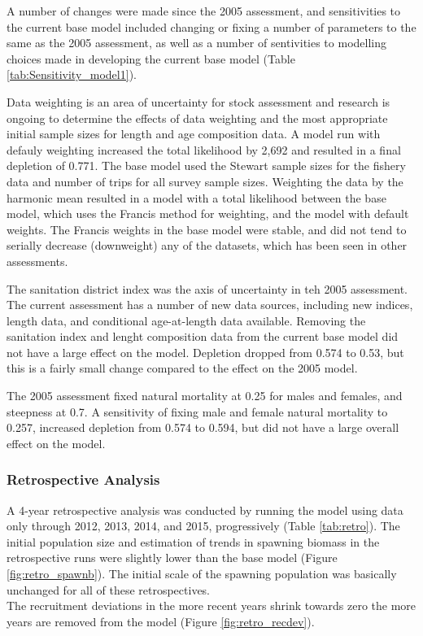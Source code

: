 \documentclass[12pt,]{article}
\begin{document}
A number of changes were made since the 2005 assessment, and
sensitivities to the current base model included changing or fixing a
number of parameters to the same as the 2005 assessment, as well as a
number of sentivities to modelling choices made in developing the
current base model (Table \ref{tab:Sensitivity_model1}).

Data weighting is an area of uncertainty for stock assessment and
research is ongoing to determine the effects of data weighting and the
most appropriate initial sample sizes for length and age composition
data. A model run with defauly weighting increased the total likelihood
by 2,692 and resulted in a final depletion of 0.771. The base model used
the Stewart sample sizes for the fishery data and number of trips for
all survey sample sizes. Weighting the data by the harmonic mean
resulted in a model with a total likelihood between the base model,
which uses the Francis method for weighting, and the model with default
weights. The Francis weights in the base model were stable, and did not
tend to serially decrease (downweight) any of the datasets, which has
been seen in other assessments.

The sanitation district index was the axis of uncertainty in teh 2005
assessment. The current assessment has a number of new data sources,
including new indices, length data, and conditional age-at-length data
available. Removing the sanitation index and lenght composition data
from the current base model did not have a large effect on the model.
Depletion dropped from 0.574 to 0.53, but this is a fairly small change
compared to the effect on the 2005 model.

The 2005 assessment fixed natural mortality at 0.25 for males and
females, and steepness at 0.7. A sensitivity of fixing male and female
natural mortality to 0.257, increased depletion from 0.574 to 0.594, but
did not have a large overall effect on the model.

\subsubsection{Retrospective Analysis}\label{retrospective-analysis}

A 4-year retrospective analysis was conducted by running the model using
data only through 2012, 2013, 2014, and 2015, progressively (Table
\ref{tab:retro}). The initial population size and estimation of trends
in spawning biomass in the retrospective runs were slightly lower than
the base model (Figure \ref{fig:retro_spawnb}). The initial scale of the
spawning population was basically unchanged for all of these
retrospectives.\\
The recruitment deviations in the more recent years shrink towards zero
the more years are removed from the model (Figure
\ref{fig:retro_recdev}).
\end{document}
